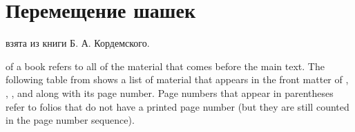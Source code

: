 \chapter{Перемещение шашек}
\label{ch:draughts-moves}

 взята из книги Б. А. Кордемского.

 of a book refers to all of the material that
comes before the main text.  The following table from shows a list of
material that appears in the front matter of \VDQI, \EI, \VE, and \BE
along with its page number.  Page numbers that appear in parentheses refer
to folios that do not have a printed page number (but they are still
counted in the page number sequence).
